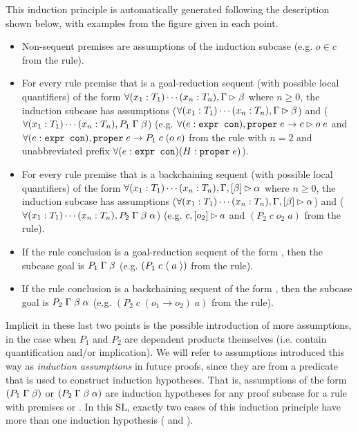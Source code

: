 This induction principle is automatically generated following the description shown below, with examples from the figure given in each point.
\begin{itemize}
 \item Non-sequent premises are assumptions of the induction subcase (e.g. $o \in c$ from the \rlnmsinit{} rule).
 \item For every rule premise that is a goal-reduction sequent (with possible local quantifiers) of the form $\forall (x_1 : T_1) \cdots (x_n : T_n), \seqsl{\beta}$ where $n \geq 0$, the induction subcase has assumptions ($\forall (x_1 : T_1) \cdots (x_n : T_n), \seqsl{\beta}$) and ($\forall (x_1 : T_1) \cdots (x_n : T_n), P_1 \; \dyncon{} \; \beta$) (e.g. $\forall (e : \sltm{expr con}), \sltm{proper} \; e \rightarrow \seqsl[c]{o \; e}$ and $\forall (e : \sltm{expr con}), \sltm{proper} \; e \rightarrow P_1 \; c \; (o \; e)$ from the \rlnmsall{} rule with $n = 2$ and unabbreviated prefix $\forall (e : \sltm{expr con}) (H : \sltm{proper} \; e)$).
 \item For every rule premise that is a backchaining sequent (with possible local quantifiers) of the form $\forall (x_1 : T_1) \cdots (x_n : T_n), \bchsl{\beta}{\alpha}$ where $n \geq 0$, the induction subcase has assumptions ($\forall (x_1 : T_1) \cdots (x_n : T_n), \bchsl{\beta}{\alpha}$) and ($\forall (x_1 : T_1) \cdots (x_n : T_n), P_2 \; \dyncon{} \; \beta \; \alpha$) (e.g. $\bchsl[c]{o_2}{a}$ and $(P_2 \; c \; o_2 \; a)$ from the \rlnmbimp{} rule).
 \item If the rule conclusion is a goal-reduction sequent of the form \seqsl{\beta}, then the subcase goal is $P_1 \; \dyncon{} \; \beta$ (e.g. $(P_1 \; c \; \atom{a})$ from the \rlnmsinit{} rule). 
 \item If the rule conclusion is a backchaining sequent of the form \bchsl{\beta}{\alpha}, then the subcase goal is $P_2 \; \dyncon{} \; \beta \; \alpha$ (e.g. $(P_2 \; c \; (o_1 \longrightarrow o_2) \; a)$ from the \rlnmbimp{} rule).
\end{itemize}
Implicit in these last two points is the possible introduction of more assumptions, in the case when $P_1$ and $P_2$ are dependent products themselves (i.e. 
contain quantification and/or implication).
We will refer to assumptions introduced this way as \emph{induction assumptions} in future proofs, since they are from a predicate that is used to construct induction hypotheses. That is, assumptions of the form $(P_1 \; \dyncon{} \; \beta)$ or $(P_2 \; \dyncon{} \; \beta \; \alpha)$ are induction hypotheses for any proof subcase for a rule with premises \seqsl{\beta} or \bchsl{\beta}{\alpha}. In this SL, exactly two cases of this induction principle have more than one induction hypothesis (\rlnmbimp{} and \rlnmsand{}).

